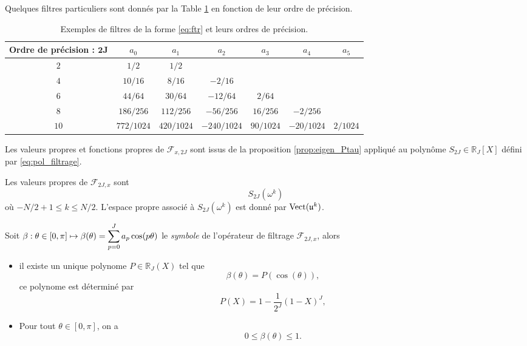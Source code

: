 Quelques filtres particuliers sont donnés par la Table \ref{tab:filter} en fonction de leur ordre de précision.
\begin{table}[htbp]
\begin{center}
\begin{tabular}{|c||cccccc|}
\hline
\textbf{Ordre de précision : }$\mathbf{2J}$ & $a_0$ & $a_1$ & $a_2$ & $a_3$ & $a_4$ & $a_5$ \\
\hline \hline
$2$ & $1/2$ & $1/2$ & & & & \\
\hline
$4$ & $10/16$ & $8/16$ & $-2/16$ & & & \\
\hline
$6$ & $44/64$ & $30/64$ & $-12/64$ & $2/64$ & & \\
\hline
$8$ & $186/256$ & $112/256$ & $-56/256$ & $16/256$ & $-2/256$ & \\
\hline
$10$ & $772/1024$ & $420/1024$ & $-240/1024$ & $90/1024$ & $-20/1024$ & $2/1024$ \\
\hline
\end{tabular}
\end{center}
\caption{Exemples de filtres de la forme \eqref{eq:ftr} et leurs ordres de précision.}
\label{tab:filter}
\end{table}

Les valeurs propres et fonctions propres de $\mathcal{F}_{x,2J}$ sont issus de la proposition \ref{prop:eigen_Ptau} appliqué au polynôme $S_{2J} \in \mathbb{R}_J [X]$ défini par \eqref{eq:pol_filtrage}.

\begin{proposition}
Les valeurs propres de $\mathcal{F}_{2J,x}$ sont 
\begin{equation}
S_{2J} (\omega^k)
\end{equation}
où $-N/2+1 \leq k \leq N/2$. L'espace propre associé à $S_{2J} (\omega^k)$ est donné par $\text{Vect}( \mathfrak{u}^k )$.
\label{prop:eigen_filtre}
\end{proposition}

\begin{theoreme}
Soit $\beta : \theta \in [0, \pi] \mapsto \beta(\theta) = \displaystyle\sum\limits_{p=0}^J a_p \cos (p \theta)$ le \textit{symbole} de l'opérateur de filtrage $\mathcal{F}_{2J,x}$, alors
\begin{itemize}
\item il existe un unique polynome $P \in \mathbb{R}_{J}(X)$ tel que
\begin{equation}
\beta(\theta) = P(\cos (\theta)),
\end{equation}
ce polynome est déterminé par
\begin{equation}
P(X) = 1 - \dfrac{1}{2^J}(1-X)^J,
\end{equation}
\item Pour tout $\theta \in [0, \pi]$, on a
\begin{equation}
0 \leq \beta(\theta) \leq 1.
\end{equation}
\end{itemize}
\label{th:filtre_dissipatif}
\end{theoreme}

